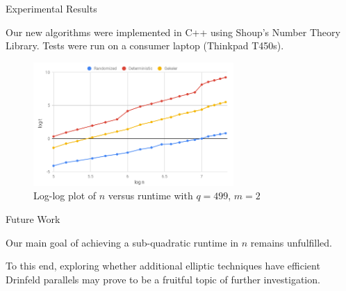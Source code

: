 \documentclass{beamer}
\begin{document}


\begin{frame}{Experimental Results}

Our new algorithms were implemented in C++ using Shoup's Number Theory Library. Tests were run on a consumer laptop (Thinkpad T450s).

\begin{figure}[h!]\label{fig:ntest499}
\centering
  \includegraphics[width=3in]{chart-499-2.png}
  \caption{Log-log plot of $n$ versus runtime with $q = 499$, $m = 2$}
\end{figure}
    
\end{frame}


\begin{frame}{Future Work}

Our main goal of achieving a sub-quadratic runtime in $n$ remains unfulfilled.

To this end, exploring whether additional elliptic techniques have efficient Drinfeld parallels may prove to be a fruitful topic of further investigation.




\end{frame}




\end{document}
